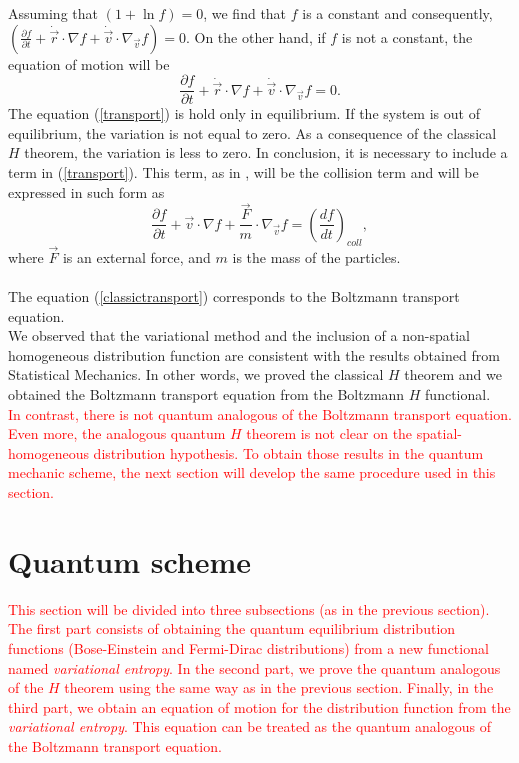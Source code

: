 \documentclass{article}
\begin{document}
Assuming that $(1+\ln f)=0$, we find that $f$ is a constant and consequently, $(\frac{\partial f}{\partial t}+\dot{\vec{r}}\cdot \nabla f+\dot{\vec{v}}\cdot \nabla_{\vec{v}} f)=0$. On the other hand, if $f$ is not a constant, the equation of motion will be
\begin{equation}
    \frac{\partial f}{\partial t}+\dot{\vec{r}}\cdot \nabla f+\dot{\vec{v}}\cdot \nabla_{\vec{v}} f=0.\label{transport}
\end{equation}
The equation (\ref{transport}) is hold only in equilibrium. If the system is out of equilibrium, the variation is not equal to zero. As a consequence of the classical $H$ theorem, the variation is less to zero. In conclusion, it is necessary to include a term in (\ref{transport}). This term, as in \cite{huang}, will be the collision term and will be expressed in such form as
\begin{equation}
    \frac{\partial f}{\partial t}+\vec{v}\cdot \nabla f+\frac{\vec{F}}{m}\cdot \nabla_{\vec{v}} f=\left( \frac{df}{dt} \right)_{coll}, \label{classictransport}
\end{equation}
where $\vec{F}$ is an external force, and $m$ is the mass of the particles.\\
\\
The equation (\ref{classictransport}) corresponds to the Boltzmann transport equation. \\
We observed that the variational method and the inclusion of a non-spatial homogeneous distribution function are consistent with the results obtained from Statistical Mechanics. In other words, we proved the classical $H$ theorem and we obtained the Boltzmann transport equation from the Boltzmann $H$ functional.\\
\textcolor{red}{In contrast, there is not quantum analogous of the Boltzmann transport equation. Even more, the analogous quantum $H$ theorem is not clear on the spatial-homogeneous distribution hypothesis. To obtain those results in the quantum mechanic scheme, the next section will develop the same procedure used in this section.}


\section{Quantum scheme}
\textcolor{red}{This section will be divided into three subsections (as in the previous section). The first part consists of obtaining the quantum equilibrium distribution functions (Bose-Einstein and Fermi-Dirac distributions) from a new functional named \textit{variational entropy}. In the second part, we prove the quantum analogous of the $H$ theorem using the same way as in the previous section. Finally, in the third part, we obtain an equation of motion for the distribution function from the \textit{variational entropy}. This equation can be treated as the quantum analogous of the Boltzmann transport equation.} 
\end{document}
